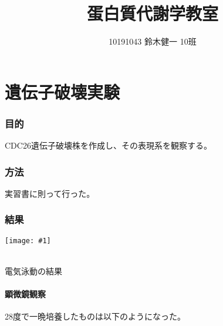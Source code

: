 \documentclass[a4paper,papersize,dvipdfmx]{jsarticle}
\newcommand{\piccap}[3]{\begin{center} \texttt{[image: \#1]} \caption{#3} \label{fig {#1}} \end{center}} %
\begin{document}
\title{蛋白質代謝学教室}
\author{10191043 鈴木健一 10班}
\date{}
\maketitle



\part*{遺伝子破壊実験}

\section*{目的}
CDC26遺伝子破壊株を作成し、その表現系を観察する。

\section*{方法}
実習書に則って行った。

\section*{結果}

\piccap{img1/edo.jpg}{8}{\\電気泳動の結果}

\subsection*{顕微鏡観察}

28度で一晩培養したものは以下のようになった。
\end{document}
